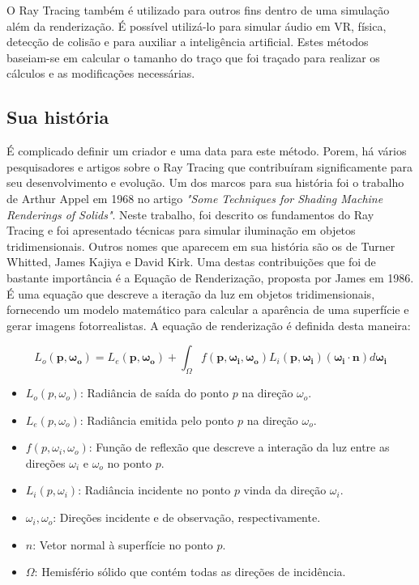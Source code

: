 \documentclass[journal]{IEEEtran}
\begin{document}
O Ray Tracing também é utilizado para outros fins dentro de uma simulação além
da renderização. É possível utilizá-lo para simular áudio em VR, física, detecção
de colisão e para auxiliar a inteligência artificial. Estes métodos baseiam-se em
calcular o tamanho do traço que foi traçado para realizar os cálculos e as modificações
necessárias.
\cite{c10}

\subsection{Sua história}
É complicado definir um criador e uma data para este método. Porem, há vários
pesquisadores e artigos sobre o Ray Tracing que contribuíram significamente para
seu desenvolvimento e evolução. Um dos marcos para sua história foi o trabalho
de Arthur Appel em 1968 no artigo \emph{"Some Techniques for Shading Machine
Renderings of Solids"}. Neste trabalho, foi descrito os fundamentos do Ray Tracing
e foi apresentado técnicas para simular iluminação em objetos tridimensionais.
Outros nomes que aparecem em sua história são os de Turner Whitted, James Kajiya
e David Kirk. Uma destas contribuições que foi de bastante importância é a
Equação de Renderização, proposta por James em 1986. É uma equação que descreve
a iteração da luz em objetos tridimensionais, fornecendo um modelo matemático
para calcular a aparência de uma superfície e gerar imagens fotorrealistas.
A equação de renderização é definida desta maneira:

\[
L_o(\mathbf{p}, \mathbf{\omega_o}) = L_e(\mathbf{p}, \mathbf{\omega_o}) + \int_{\Omega} f(\mathbf{p}, \mathbf{\omega_i}, \mathbf{\omega_o}) L_i(\mathbf{p}, \mathbf{\omega_i}) (\mathbf{\omega_i} \cdot \mathbf{n}) d\mathbf{\omega_i}
\]

\vspace{10pt}
\begin{itemize}
  \item $L_o(p, \omega_o)$: Radiância de saída do ponto $p$ na direção $\omega_o$.
  \item $L_e(p, \omega_o)$: Radiância emitida pelo ponto $p$ na direção $\omega_o$.
  \item $f(p, \omega_i, \omega_o)$: Função de reflexão que descreve a interação da luz entre as direções $\omega_i$ e $\omega_o$ no ponto $p$.
  \item $L_i(p, \omega_i)$: Radiância incidente no ponto $p$ vinda da direção $\omega_i$.
  \item $\omega_i, \omega_o$: Direções incidente e de observação, respectivamente.
  \item $n$: Vetor normal à superfície no ponto $p$.
  \item $\Omega$: Hemisfério sólido que contém todas as direções de incidência.
\end{itemize}
\end{document}
